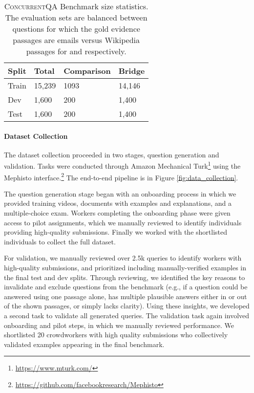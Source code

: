 \documentclass{article}
\newcommand{\datasetname}{\textsc{ConcurrentQA}\xspace}
\begin{document}
\begin{table}[t]
\begin{center}
\begin{tabular}{p{1cm}p{1.5cm}p{2cm}p{1.5cm}}
\toprule
Split & Total & Comparison & Bridge \\
\midrule
Train & 15,239  &  1093 & 14,146 \\
Dev   & 1,600 & 200 & 1,400 \\
Test  & 1,600 & 200 & 1,400 \\
\bottomrule
\end{tabular}
\caption{\datasetname Benchmark size statistics. The evaluation sets are balanced between questions for which the gold evidence passages are emails versus Wikipedia passages for  and  respectively.}
\vspace{-6mm}
\label{tab:mutlihopqa_splits}
\end{center}
\end{table}

\paragraph{Dataset Collection}
The dataset collection proceeded in two stages, question generation and validation. 
Tasks were conducted through Amazon Mechanical Turk\footnote{\url{https://www.mturk.com/}} using the Mephisto interface.\footnote{\url{https://github.com/facebookresearch/Mephisto}} The end-to-end pipeline is in Figure \ref{fig:data_collection}. 

The question generation stage began with an onboarding process in which we provided training videos, documents with examples and explanations, and a multiple-choice exam. Workers completing the onboarding phase were given access to pilot assignments, which we manually reviewed to identify individuals providing high-quality submissions. Finally we worked with the shortlisted individuals to collect the full dataset. 

For validation, we manually reviewed over 2.5k queries to identify workers with high-quality submissions, and prioritized including manually-verified examples in the final test and dev splits. Through reviewing, we identified the key reasons to invalidate and exclude questions from the benchmark (e.g., if a question could be answered using one passage alone, has multiple plausible answers either in or out of the shown passages, or simply lacks clarity). Using these insights, we developed a second task to validate all generated queries. 
The validation task again involved onboarding and pilot steps, in which we manually reviewed performance. We shortlisted 20 crowdworkers with high quality submissions who collectively validated examples appearing in the final benchmark. 
\end{document}
